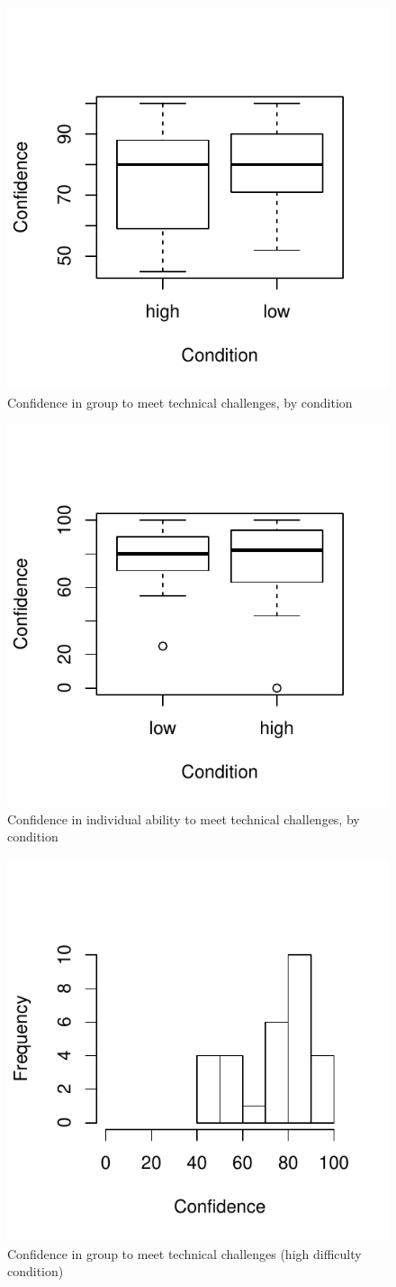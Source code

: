 \begin{figure}
  \centering
   \includegraphics[width=0.5\linewidth,keepaspectratio] {images/groupConfChallengesBoxplot-1}
  \caption{Confidence in group to meet technical challenges, by condition}
  \label{fig:groupConfChallengesBoxplot}
\end{figure}

\begin{figure}
  \centering
   \includegraphics[width=0.5\linewidth,keepaspectratio] {images/indConfChallengesBoxplot-1}
  \caption{Confidence in individual ability to meet technical challenges, by condition}
  \label{fig:indConfChallengesBoxplot}
\end{figure}


\begin{figure}
  \centering
  \includegraphics[width=0.5\linewidth,keepaspectratio] {images/histHighGroupConfidence-1}
  \caption{Confidence in group to meet technical challenges (high difficulty condition)}
  \label{fig:groupConfChallengesBoxplot}
\end{figure}

